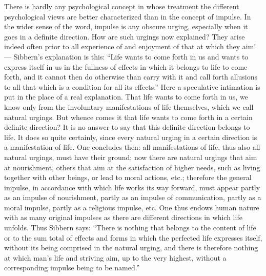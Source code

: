 \documentclass[12pt,a4paper,openany]{book}
\newcommand{\opage}[1]{\marginnote{\footnotesize\textit{[#1]}}}
\begin{document}
There is hardly any psychological concept in whose
treatment the different psychological views are better
characterized than in the concept of impulse. In the wider sense
of the word, impulse is any obscure urging, especially when it
goes in a definite direction. How are such
urgings now explained? They arise indeed often prior to all experience of
and enjoyment of that at which they aim! --- Sibbern's explanation is
this: ``Life wants to come forth in us and wants to express itself in us in the fullness
of effects in which it belongs to life to come forth,
and it cannot then do otherwise than carry with it and call forth
allusions to all that which is a condition for all its
effects.'' Here a speculative intimation is put in the place
of a real explanation. That life wants to come forth in us, we know
only from the involuntary manifestations of life themselves, which we call
natural urgings. But whence comes it that life wants to come forth in
\opage{78}a certain definite direction? It is no answer to say that this
definite direction belongs to life. It does so quite
certainly, since every natural urging in a certain direction is a
manifestation of life. One concludes then: all manifestations of life, thus also all
natural urgings, must have their ground; now there are
natural urgings that aim at nourishment, others that aim
at the satisfaction of higher needs, such as living together with
other beings, or lead to moral actions, etc.;
therefore the general impulse, in accordance with which life
works its way forward, must appear partly as an impulse of nourishment, partly
as an impulse of communication, partly as a moral impulse, partly as
a religious impulse, etc. One thus endows human
nature with as many original impulses as there are
different directions in which life unfolds. Thus
Sibbern says: ``There is nothing that belongs to the content of life
or to the sum total of effects and forms
in which the perfected life expresses itself, without its being comprised
in the natural urging, and there is therefore nothing at which
man's life and striving aim, up to the very highest,
without a corresponding impulse being to be named.''
\end{document}
